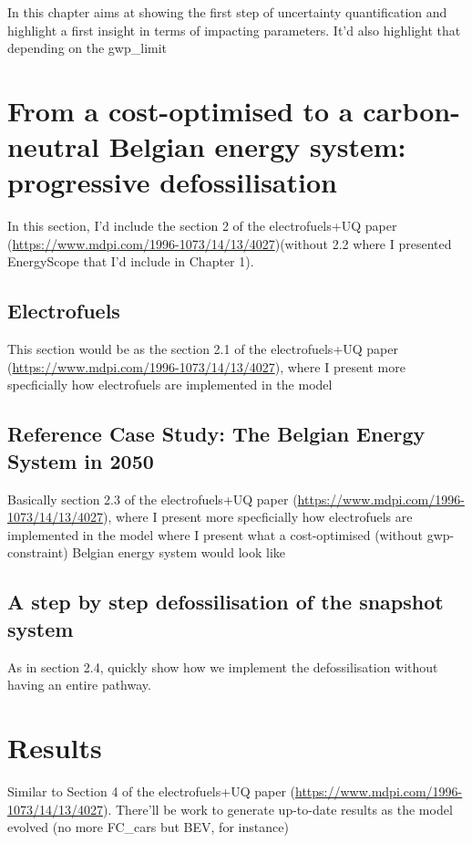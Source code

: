 
In this chapter aims at showing the first step of uncertainty quantification and highlight a first insight in terms of impacting parameters. It'd also highlight that depending on the gwp\_limit 
\section{From a cost-optimised to a carbon-neutral Belgian energy system: progressive defossilisation}
\label{sec:chap_2_ses_sec2}
In this section, I'd include the section 2 of the electrofuels+UQ paper (\url{https://www.mdpi.com/1996-1073/14/13/4027})(without 2.2 where I presented EnergyScope that I'd include in Chapter 1).

\subsection{Electrofuels}
\label{subsec:chap2_electrofuels}
This section would be as the section 2.1 of the electrofuels+UQ paper (\url{https://www.mdpi.com/1996-1073/14/13/4027}), where I present more specficially how electrofuels are implemented in the model

\subsection{Reference Case Study: The Belgian Energy System in 2050}
\label{subsec:chap2_case_study}
Basically section 2.3 of the electrofuels+UQ paper (\url{https://www.mdpi.com/1996-1073/14/13/4027}), where I present more specficially how electrofuels are implemented in the model where I present what a cost-optimised (without gwp-constraint) Belgian energy system would look like

\subsection{A step by step defossilisation of the snapshot system}
\label{subsec:chap2_defossilisation}
As in section 2.4, quickly show how we implement the defossilisation without having an entire pathway.

\section{Results}
\label{sec:chap2_results}
Similar to Section 4 of the electrofuels+UQ paper (\url{https://www.mdpi.com/1996-1073/14/13/4027}). There'll be work to generate up-to-date results as the model evolved (no more FC\_cars but BEV, for instance)
